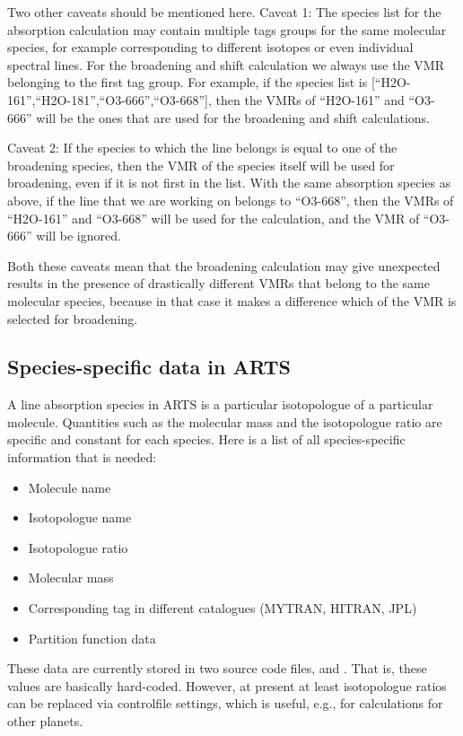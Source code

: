 Two other caveats should be mentioned here. Caveat 1: The species list for the
absorption calculation may contain multiple tags groups for the same
molecular species, for example corresponding to different isotopes or
even individual spectral lines. For the broadening and shift
calculation we always use the VMR belonging to the first tag
group. For example, if the species list is
[``H2O-161'',``H2O-181'',``O3-666'',``O3-668''], then the VMRs of
``H2O-161'' and ``O3-666'' will be the ones that are used for the broadening and
shift calculations.

Caveat 2: If the species to which the line belongs is equal to one of
the broadening species, then the VMR of the species itself will be
used for broadening, even if it is not first in the list. With the
same absorption species as above, if the line that we are working on
belongs to ``O3-668'', then the VMRs of ``H2O-161'' and ``O3-668''
will be used for the calculation, and the VMR of ``O3-666'' will be
ignored. 

Both these caveats mean that the broadening calculation may
give unexpected results in the presence of drastically different VMRs
that belong to the same molecular species, because in that case it makes a
difference which of the VMR is selected for broadening.


\subsection{Species-specific data in ARTS}
\label{sec:abs_theory:species_data}

A line absorption species in ARTS is a particular isotopologue of a
particular molecule.  Quantities such as the molecular mass and the
isotopologue ratio are specific and constant for each species.  Here is a
list of all species-specific information that is needed:
\begin{itemize}
\item Molecule name
\item Isotopologue name
\item Isotopologue ratio
\item Molecular mass
\item Corresponding tag in different catalogues (MYTRAN, HITRAN, JPL)
\item Partition function data
\end{itemize}

These data are currently stored in two source code files,
 and . 
That is, these values are basically hard-coded.
However, at present at least isotopologue ratios can be replaced via controlfile
settings, which is useful, e.g., for calculations for other planets.

